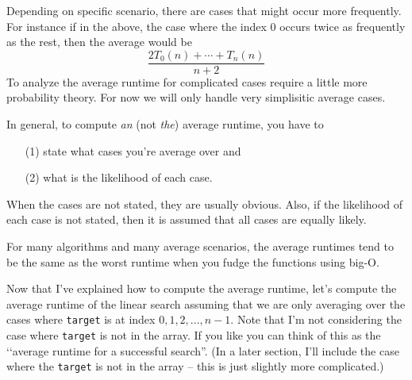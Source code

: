 Depending on specific scenario, 
there are cases that might occur more frequently.
For instance if in the above, the case where the index 0 occurs twice
as frequently as the rest, then the average would be
\[
\frac{2T_0(n) + \cdots + T_n(n)}{n + 2}
\]
To analyze the average runtime for
complicated cases require a little more probability theory.
For now we will only handle very simplisitic average cases.

In general, to compute \textit{an} (not \textit{the}) 
average runtime, you have to 
\begin{enumerate}[nosep]
\item[(1)] state what cases you're average over and 
\item[(2)] what is the likelihood of each case.
\end{enumerate}
When the cases are not stated, they are usually obvious.
Also, if the likelihood of each case is not stated, then it is assumed
that all cases are equally likely.

For many algorithms and many average scenarios, 
the average runtimes tend to be
the same as the worst runtime when you fudge the functions using big-O. 

Now that I've explained how to compute the average runtime, let's
compute the average runtime of the linear search assuming that we
are only averaging over the cases where
\verb!target! is at index $0, 1, 2, ...,  n - 1$.
Note that I'm not considering the case 
where \verb!target! is not in the array.
If you like you can think of this as the 
\lq\lq average runtime for a successful search''.
(In a later section, I'll include the case where the \verb!target!
is not in the array -- this is just slightly more complicated.)

